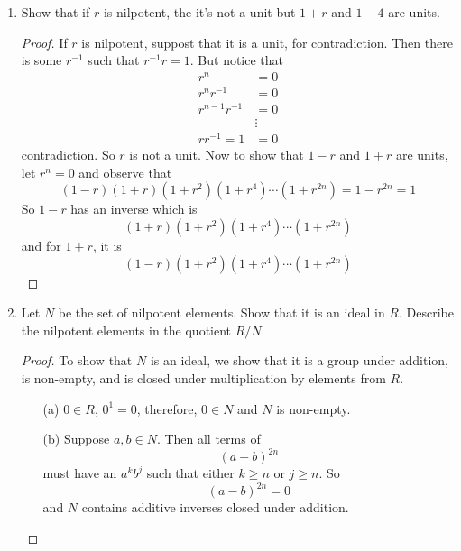 \documentclass{article}
\begin{document}
\begin{enumerate}
        \item Show that if $r$ is nilpotent, the it's not a unit but $1 + r$ and $1 - 4$ are units.
            \begin{proof}
                If $r$ is nilpotent, suppost that it is a unit, for contradiction. Then there is some $r^{-1}$ such that $r^{-1}r = 1$. But notice that
                \begin{align*}
                    r^{n} &= 0 \\
                    r^{n}r^{-1} &= 0 \\
                    r^{n - 1}r^{-1} &= 0 \\
                                    &\vdots \\
                    rr^{-1} = 1 &= 0
                \end{align*}
                contradiction. So $r$ is not a unit. Now to show that $1 - r$ and $1 + r$ are units, let $r^{n} = 0$ and observe that
                \begin{equation*}
                    (1 - r)(1 + r)(1 + r^{2})(1 + r^{4}) \cdots (1 + r^{2n}) = 1 - r^{2n} = 1
                \end{equation*}
                So $1 - r$ has an inverse which is 
                \begin{equation*}
                    (1 + r)(1 + r^{2})(1 + r^{4}) \cdots (1 + r^{2n})
                \end{equation*}
                and for $1 + r$, it is
                \begin{equation*}
                    (1 - r)(1 + r^{2})(1 + r^{4}) \cdots (1 + r^{2n})
                \end{equation*}
            \end{proof}

        \item Let $N$ be the set of nilpotent elements. Show that it is an ideal in $R$. Describe the nilpotent elements in the quotient $R/N$.

            \begin{proof}
                To show that $N$ is an ideal, we show that it is a group under addition, is non-empty, and is closed under multiplication by elements from $R$.
                \begin{enumerate}
                    \item [(a)] $0 \in R$, $0^{1} = 0$, therefore, $0 \in N$ and $N$ is non-empty.

                    \item [(b)] Suppose $a, b \in N$. Then all terms of 
                        \begin{equation*}
                            (a - b)^{2n}
                        \end{equation*}
                        must have an $a^{k}b^{j}$ such that either $k \geq n$ or $j \geq n$. So
                        \begin{equation*}
                            (a - b)^{2n} = 0
                        \end{equation*}
                        and $N$ contains additive inverses closed under addition.


\end{enumerate}
\end{proof}
\end{enumerate}
\end{document}
